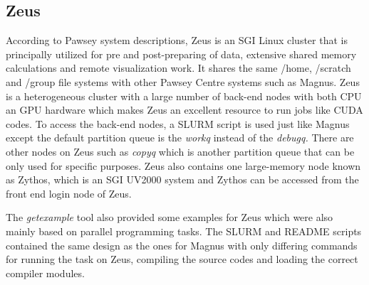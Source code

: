 \subsection{Zeus}

According to Pawsey system descriptions, Zeus is an SGI Linux cluster that is principally utilized for pre and post-preparing of data, extensive shared 
memory calculations and remote visualization work. It shares the same /home, /scratch and /group file systems with other Pawsey Centre systems such as 
Magnus. Zeus is a heterogeneous cluster with a large number of back-end nodes with both CPU an GPU hardware which makes Zeus an excellent resource to run
jobs like CUDA codes. To access the back-end nodes, a SLURM script is used just like Magnus except the default partition queue is the \emph{workq} instead of 
the \emph{debugq.} There are other nodes on Zeus such as \emph{copyq} which is another partition queue that can be only used for specific purposes. Zeus also contains 
one large-memory node known as Zythos, which is an SGI UV2000 system and Zythos can be accessed from the front end login node of Zeus. 

The \emph{getexample} tool also provided some examples for Zeus which were also mainly based on parallel programming tasks. The SLURM and README scripts
contained the same design as the ones for Magnus with only differing commands for running the task on Zeus, compiling the source codes and loading the
correct compiler modules. 
 
